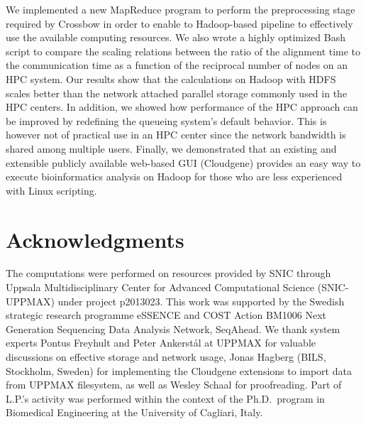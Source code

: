 \documentclass[10pt]{article}
\begin{document}
We implemented a new MapReduce program to perform the preprocessing stage
required by Crossbow in order to enable to Hadoop-based pipeline to effectively
use the available computing resources. We also wrote a highly optimized Bash
script to compare the scaling relations between the ratio of the alignment time
to the communication time as a function of the reciprocal number of nodes on an
HPC system.  Our results show that the calculations on Hadoop with HDFS scales
better than the network attached parallel storage commonly used in the HPC
centers.  In addition, we showed how performance of the HPC approach can be
improved by redefining the queueing system's default behavior. This is however
not of practical use in an HPC center since the network bandwidth is shared
among multiple users. Finally, we demonstrated that an existing and extensible
publicly available web-based GUI (Cloudgene) provides an easy way to execute
bioinformatics analysis on Hadoop for those who are less experienced with Linux
scripting.



\section*{Acknowledgments}
The computations were performed on resources provided by SNIC through Uppsala Multidisciplinary Center for Advanced Computational Science (SNIC-UPPMAX) under project p2013023. This work was supported by the Swedish strategic research programme eSSENCE and COST Action BM1006 Next Generation Sequencing Data Analysis Network, SeqAhead.
We thank system experts Pontus Freyhult and Peter Ankerst{\aa}l at UPPMAX for valuable discussions on effective storage and network usage, Jonas Hagberg (BILS, Stockholm, Sweden) for implementing the Cloudgene extensions to import data from UPPMAX filesystem, as well as Wesley Schaal for proofreading.
Part of L.P.'s activity was performed within the context of the Ph.D.\ program in
Biomedical Engineering at the University of Cagliari, Italy.





\end{document}

